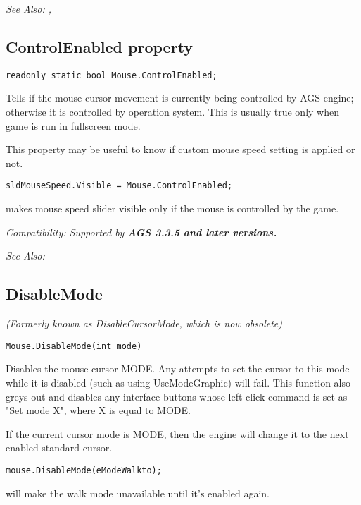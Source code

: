 \it{See Also:} ,


\subsection{ControlEnabled property}\label{Mouse.ControlEnabled}%

\begin{verbatim}
readonly static bool Mouse.ControlEnabled;
\end{verbatim}
Tells if the mouse cursor movement is currently being controlled by AGS engine; otherwise it is controlled by operation system.
This is usually true only when game is run in fullscreen mode.

This property may be useful to know if custom mouse speed setting is applied or not.

\begin{verbatim}
sldMouseSpeed.Visible = Mouse.ControlEnabled;
\end{verbatim}
makes mouse speed slider visible only if the mouse is controlled by the game.

\it{Compatibility:} Supported by \bf{AGS 3.3.5} and later versions.

\it{See Also:} 


\subsection{DisableMode}\label{Mouse.DisableMode}%

\it{(Formerly known as DisableCursorMode, which is now obsolete)}

\begin{verbatim}
Mouse.DisableMode(int mode)
\end{verbatim}
Disables the mouse cursor MODE. Any attempts to set the cursor to this mode
while it is disabled (such as using UseModeGraphic) will fail. This function
also greys out and disables any interface buttons whose left-click command
is set as "Set mode X", where X is equal to MODE.

If the current cursor mode is MODE, then the engine will change it to the
next enabled standard cursor.

\begin{verbatim}
mouse.DisableMode(eModeWalkto);
\end{verbatim}
will make the walk mode unavailable until it's enabled again.

